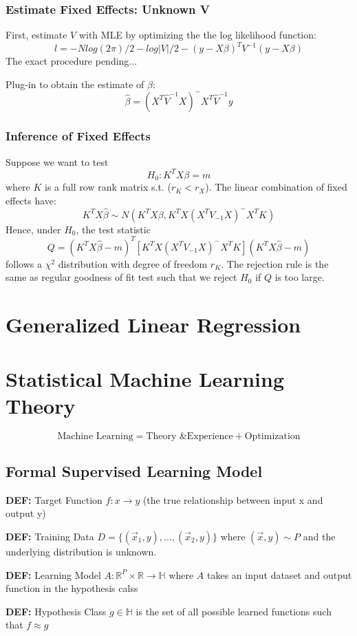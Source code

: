\documentclass[9pt]{article}
\newcommand{\de}{\textbf{DEF: }}
\newcommand{\x}{\vec{x}}
\begin{document}
\subsubsection{Estimate Fixed Effects: Unknown V}
First, estimate $V$ with MLE by optimizing the the log likelihood function:
$$
l = -Nlog(2\pi)/2 - log|V|/2 - (y-X\beta)^TV^{-1}(y-X\beta)
$$
The exact procedure pending...

Plug-in to obtain the estimate of $\beta$:
$$
\hat\beta = (X^T\hat V^{-1}X)^-X^T\hat V^{-1}y
$$
\subsubsection{Inference of Fixed Effects}
Suppose we want to test
$$
H_0: K^TX\beta = m
$$
where $K$ is a full row rank matrix s.t. ($r_K<r_X$). The linear combination of fixed effects have:
$$
K^TX\hat\beta \sim N(K^TX\beta, K^TX(X^TV_{-1}X)^-X^TK)
$$
Hence, under $H_0$, the test statistic
$$
Q = (K^TX\hat\beta-m)^T[K^TX(X^TV_{-1}X)^-X^TK](K^TX\hat\beta-m)
$$
follows a $\chi^2$ distribution with degree of freedom $r_K$.  The rejection rule is the same as regular goodness of fit test such that we reject $H_0$ if $Q$ is too large.

\newpage
\section{Generalized Linear Regression}

\newpage
\section{Statistical Machine Learning Theory}
$$
\text{Machine Learning} = \text{Theory \& Experience} + \text{Optimization}
$$
\subsection{Formal Supervised Learning Model}
\de Target Function $f:x\to y$ (the true relationship between input x and output y)\par
\de Training Data $D = \{(\x_1, y),...,(\x_2,y)\}$ where $(\x, y)\sim P$ and the underlying distribution is unknown.\par
\de  Learning Model $A: \mathbb{R}^P\times \mathbb{R}\to \mathbb{H}$ where $A$ takes an input dataset and output function in the hypothesis calss\par
\de Hypothesis Class $g\in\mathbb{H}$ is the set of all possible learned functions such that $f\approx g$\par
\end{document}
